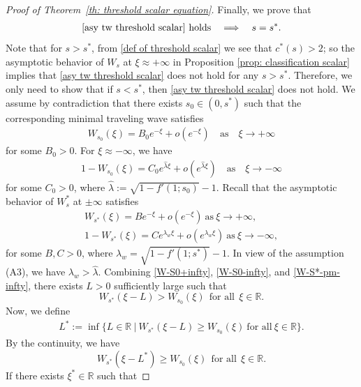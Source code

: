 \documentclass[11pt,a4paper]{article}
\numberwithin{equation}{section}
\numberwithin{figure}{section}
\newcommand\bea{\begin{eqnarray}}
\newcommand\eea{\end{eqnarray}}
\newcommand\beaa{\begin{eqnarray*}}
\newcommand\eeaa{\end{eqnarray*}}
\begin{document}
\begin{proof}[Proof of Theorem~\ref{th: threshold scalar equation}]

Finally, we prove that
\bea\label{th1:goal-2}
\mbox{\eqref{asy tw threshold scalar} holds} \quad \Longrightarrow \quad s=s^*.
\eea
Note that for $s>s^*$, from \eqref{def of threshold scalar} we see that $c^{*}(s)>2$; so the asymptotic behavior of $W_s$ at $\xi\approx+\infty$ in Proposition \ref{prop: classification scalar} implies that
\eqref{asy tw threshold scalar} does not hold for any $s>s^*$. Therefore,
we only need to show that if $s<s^*$, then \eqref{asy tw threshold scalar} does not hold.
We assume by contradiction that there exists $s_0\in(0,s^*)$ such that
the corresponding minimal traveling wave satisfies
\bea\label{W-S0+infty}
W_{s_0}(\xi)=B_0 e^{-\xi}+o(e^{-\xi})\quad\text{as}\quad \xi\to+\infty
\eea
for some $B_0>0$. For $\xi\approx -\infty$, we have
\bea\label{W-S0-infty}
1-W_{s_0}(\xi)=C_0 e^{\hat\lambda\xi}+o(e^{\hat\lambda\xi})\quad\text{as}\quad \xi\to-\infty
\eea
for some $C_0>0$, where $\hat\lambda:=\sqrt{1-f'(1;s_0)}-1$.
Recall that the asymptotic behavior of $W_s^*$ at $\pm\infty$ satisfies
\begin{equation}\label{W-S*-pm-infty}
\begin{aligned}
W_{s^*}(\xi)=B e^{-\xi}+o(e^{-\xi})\ \text{as}\ \xi\to+\infty,\\
1-W_{s^*}(\xi)=C e^{\lambda_w\xi}+o(e^{\lambda_w\xi})\ \text{as}\ \xi\to-\infty,
\end{aligned}
\end{equation}
for some $B,C>0$, where $\lambda_w=\sqrt{1-f'(1;s^*)}-1$. In view of the assumption (A3), we have $\lambda_w> \hat\lambda$.
Combining \eqref{W-S0+infty}, \eqref{W-S0-infty}, and \eqref{W-S*-pm-infty}, there exists $L>0$ sufficiently large such that
$$W_{s^*}(\xi-L)> W_{s_0}(\xi)\ \ \text{for all}\ \ \xi\in\mathbb{R}.$$
Now, we define
\beaa
L^*:=\inf\{L\in\mathbb{R}\ |\ W_{s^*}(\xi-L)\ge W_{s_0}(\xi)\ \text{for all}\ \xi\in\mathbb{R}\}.
\eeaa
By the continuity, we have 
$$W_{s^*}(\xi-L^*)\geq W_{s_0}(\xi)\ \ \text{for all}\ \ \xi\in\mathbb{R}.$$
 If there exists $\xi^*\in\mathbb{R}$ such that

\end{proof}
\end{document}
